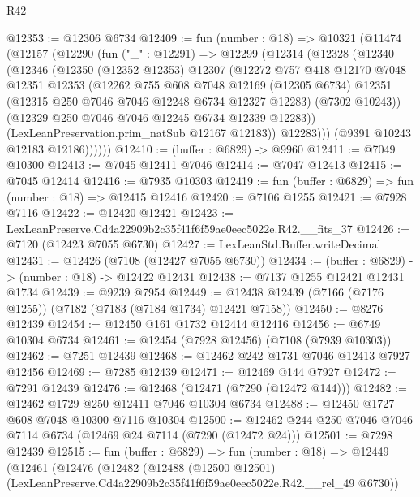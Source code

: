 \begin{lexlean}{R42}
\begin{coremodule}
{@12353 := @12306 @6734
@12409 := fun (number : @18) =>
  @10321
    (@11474
      (@12157
        (@12290
          (fun ("_" : @12291) =>
          @12299
            (@12314
              (@12328
                (@12340
                  (@12346
                    (@12350
                      (@12352 @12353)
                      @12307
                      (@12272
                        @757
                        @418
                        @12170
                        @7048
                        @12351
                        @12353
                        (@12262
                          @755
                          @608
                          @7048
                          @12169
                          (@12305 @6734)
                          @12351
                          (@12315 @250 @7046 @7046 @12248 @6734 @12327 @12283)
                          (@7302 @10243))
                        (@12329 @250 @7046 @7046 @12245 @6734 @12339 @12283))
                      (LexLeanPreservation.prim_natSub @12167 @12183))
                    @12283)))
              (@9391 @10243 @12183 @12186))))))
@12410 := (buffer : @6829) -> @9960
@12411 := @7049 @10300
@12413 := @7045 @12411 @7046
@12414 := @7047 @12413
@12415 := @7045 @12414
@12416 := @7935 @10303
@12419 := fun (buffer : @6829) => fun (number : @18) => @12415 @12416
@12420 := @7106 @1255
@12421 := @7928 @7116
@12422 := @12420 @12421
@12423 := LexLeanPreserve.Cd4a22909b2c35f41f6f59ae0eec5022e.R42.__fits_37
@12426 := @7120 (@12423 @7055 @6730)
@12427 := LexLeanStd.Buffer.writeDecimal
@12431 := @12426 (@7108 (@12427 @7055 @6730))
@12434 := (buffer : @6829) -> (number : @18) -> @12422 @12431
@12438 := @7137 @1255 @12421 @12431 @1734
@12439 := @9239 @7954
@12449 := @12438 @12439 (@7166 (@7176 @1255)) (@7182 (@7183 (@7184 @1734) @12421 @7158))
@12450 := @8276 @12439
@12454 := @12450 @161 @1732 @12414 @12416
@12456 := @6749 @10304 @6734
@12461 := @12454 (@7928 @12456) (@7108 (@7939 @10303))
@12462 := @7251 @12439
@12468 := @12462 @242 @1731 @7046 @12413 @7927 @12456
@12469 := @7285 @12439
@12471 := @12469 @144 @7927
@12472 := @7291 @12439
@12476 := @12468 (@12471 (@7290 (@12472 @144)))
@12482 := @12462 @1729 @250 @12411 @7046 @10304 @6734
@12488 := @12450 @1727 @608 @7048 @10300 @7116 @10304
@12500 := @12462 @244 @250 @7046 @7046 @7114 @6734 (@12469 @24 @7114 (@7290 (@12472 @24)))
@12501 := @7298 @12439
@12515 := fun (buffer : @6829) =>
  fun (number : @18) =>
  @12449
    (@12461
      (@12476
        (@12482
          (@12488
            (@12500 @12501)
            (LexLeanPreserve.Cd4a22909b2c35f41f6f59ae0eec5022e.R42.__rel_49 @6730))
}
\end{coremodule}
\end{lexlean}
